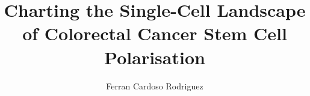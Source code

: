 
\title{Charting the Single-Cell Landscape of Colorectal Cancer Stem Cell Polarisation}
\author{Ferran Cardoso Rodriguez}

\maketitle

\makedeclaration





